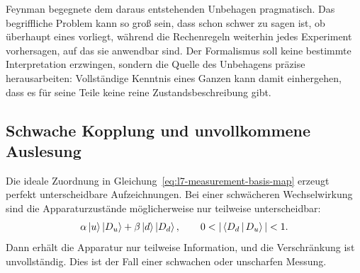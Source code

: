 Feynman begegnete dem daraus entstehenden Unbehagen pragmatisch. Das begriffliche Problem kann so groß sein, dass schon schwer zu sagen ist, ob überhaupt eines vorliegt, während die Rechenregeln weiterhin jedes Experiment vorhersagen, auf das sie anwendbar sind. Der Formalismus soll keine bestimmte Interpretation erzwingen, sondern die Quelle des Unbehagens präzise herausarbeiten: Vollständige Kenntnis eines Ganzen kann damit einhergehen, dass es für seine Teile keine reine Zustandsbeschreibung gibt.

\begin{classroomqa}
\end{classroomqa}

\begin{classroomqa}
\end{classroomqa}

\subsection{Schwache Kopplung und unvollkommene Auslesung}

Die ideale Zuordnung in Gleichung~\eqref{eq:l7-measurement-basis-map} erzeugt perfekt unterscheidbare Aufzeichnungen. Bei einer schwächeren Wechselwirkung sind die Apparaturzustände möglicherweise nur teilweise unterscheidbar:
\begin{equation}
\alpha\ket{u}\ket{D_u}
+\beta\ket{d}\ket{D_d},
\qquad
0<|\braket{D_d}{D_u}|<1.
\label{eq:l7-weak-measurement}
\end{equation}
Dann erhält die Apparatur nur teilweise Information, und die Verschränkung ist unvollständig. Dies ist der Fall einer schwachen oder unscharfen Messung.


